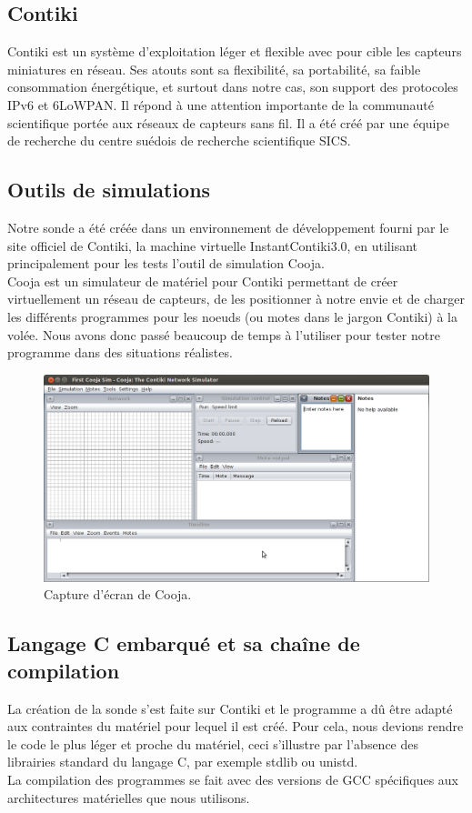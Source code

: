 	\subsection{Contiki}
	Contiki est un système d'exploitation léger et flexible avec pour cible les capteurs miniatures en réseau. Ses atouts sont sa flexibilité, sa portabilité, sa faible consommation énergétique, et surtout dans notre cas, son support des protocoles IPv6 et 6LoWPAN. Il répond à une attention importante de la communauté scientifique portée aux réseaux de capteurs sans fil. Il a été créé par une équipe de recherche du centre suédois de recherche scientifique SICS.
	
	\subsection{Outils de simulations}
	Notre sonde a été créée dans un environnement de développement fourni par le site officiel de Contiki, la machine virtuelle InstantContiki3.0, en utilisant principalement pour les tests l'outil de simulation Cooja.\\
	Cooja est un simulateur de matériel pour Contiki permettant de créer virtuellement un réseau de capteurs, de les positionner à notre envie et de charger les différents programmes pour les noeuds (ou motes dans le jargon Contiki) à la volée.
	Nous avons donc passé beaucoup de temps à l'utiliser pour tester notre programme dans des situations réalistes.
	\clearpage
	\begin{figure}[htp]
		\centering
		\includegraphics[width=16cm]{images/cooja}
		\caption{Capture d'écran de Cooja.}
		\label{fig:Cooja}
	\end{figure}

	\subsection{Langage C embarqué et sa chaîne de compilation}
	La création de la sonde s'est faite sur Contiki et le programme a dû être adapté aux contraintes du matériel pour lequel il est créé. Pour cela, nous devions rendre le code le plus léger et proche du matériel, ceci s'illustre par l'absence des librairies standard du langage C, par exemple stdlib ou unistd.\\
	La compilation des programmes se fait avec des versions de GCC spécifiques aux architectures matérielles que nous utilisons.
	
